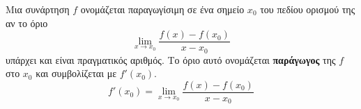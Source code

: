 Μια συνάρτηση $f$ ονομάζεται παραγωγίσιμη σε ένα σημείο $ x_0 $ του πεδίου ορισμού της αν το όριο
\[ \lim_{x\to x_0}{\frac{f(x)-f(x_0)}{x-x_0}} \]
υπάρχει και είναι πραγματικός αριθμός. Το όριο αυτό ονομάζεται \textbf{παράγωγος} της $ f $ στο $ x_0 $ και συμβολίζεται με $ f'(x_0) $.
\[ f'(x_0)=\lim_{x\to x_0}{\frac{f(x)-f(x_0)}{x-x_0}} \]
